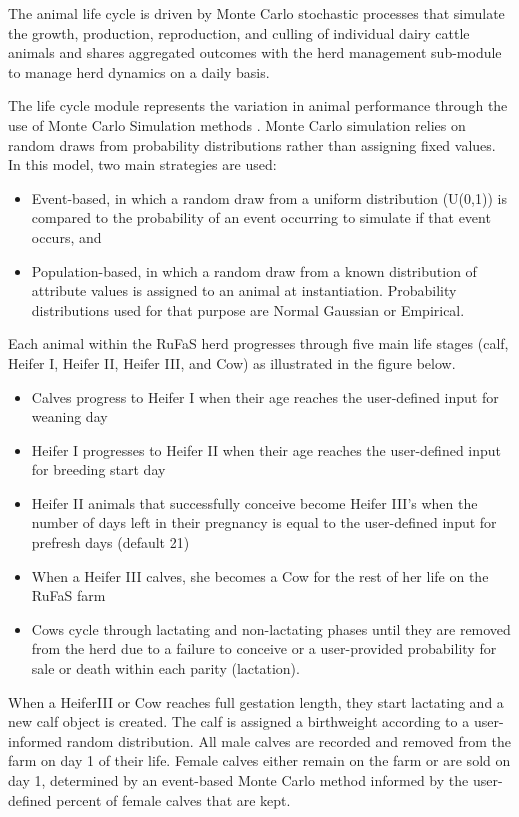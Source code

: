 \documentclass{article}
\begin{document}
\begin{refsection}
The animal life cycle is driven by Monte Carlo stochastic processes that simulate the growth, production, reproduction, and culling of individual dairy cattle animals and shares aggregated outcomes with the herd management sub-module to manage herd dynamics on a daily basis. 
 
The life cycle module represents the variation in animal performance through the use of Monte Carlo Simulation methods \parencite{reuven2017}. Monte Carlo simulation relies on random draws from probability distributions rather than assigning fixed values. In this model, two main strategies are used:
\begin{itemize}
    \item Event-based, in which a random draw from a uniform distribution (U(0,1)) is compared to the probability of an event occurring to simulate if that event occurs, and 
    \item Population-based, in which a random draw from a known distribution of attribute values is assigned to an animal at instantiation. Probability distributions used for that purpose are Normal Gaussian or Empirical. 
\end{itemize}

Each animal within the RuFaS herd progresses through five main life stages (calf, Heifer I, Heifer II, Heifer III, and Cow) as illustrated in the figure below. 
\begin{itemize}
    \item Calves progress to Heifer I when their age reaches the user-defined input for weaning day
    \item Heifer I progresses to Heifer II when their age reaches the user-defined input for breeding start day 
    \item Heifer II animals that successfully conceive become Heifer III's when the number of days left in their pregnancy is equal to the user-defined input for prefresh days (default 21)
    \item When a Heifer III calves, she becomes a Cow for the rest of her life on the RuFaS farm
    \item Cows cycle through lactating and non-lactating phases until they are removed from the herd due to a failure to conceive or a user-provided probability for sale or death within each parity (lactation).

\end{itemize}

When a HeiferIII or Cow reaches full gestation length, they start lactating and a new calf object is created. The calf is assigned a birthweight according to a user-informed random distribution. All male calves are recorded and removed from the farm on day 1 of their life. Female calves either remain on the farm or are sold on day 1, determined by an event-based Monte Carlo method informed by the user-defined percent of female calves that are kept. 




\end{refsection}
\end{document}
